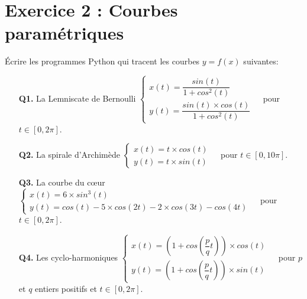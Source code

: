 \documentclass[a4paper,11pt]{article}
\theoremstyle{mytheor}
\begin{document}
\section*{Exercice 2 : Courbes paramétriques}
Écrire les programmes Python qui tracent les courbes $y = f(x)$ suivantes:
\begin{enumerate}
\item[\textbf{Q1.}] La Lemniscate de Bernoulli $
\left\{
\begin{array}{ll}
x(t) = \dfrac{sin(t)}{1 + cos^2(t)}&\\
y(t) =\dfrac{sin(t) \times cos(t)}{1 + cos^2(t)}&
\end{array} 
\right.$ 
pour $ t\in[0, 2\pi]$.
\item[\textbf{Q2.}] La spirale d'Archimède $
\left\{
\begin{array}{ll}
x(t) = t \times cos(t)&\\
y(t) =t \times sin(t)&
\end{array} 
\right.$ 
pour $ t\in[0, 10\pi]$.
\newpage
\item[\textbf{Q3.}] La courbe du c\oe{}ur $
\left\{
\begin{array}{ll}
x(t) = 6 \times sin^3(t)&\\
y(t) = cos(t)-5 \times cos(2t)-2 \times cos(3t)-cos(4t)&
\end{array} 
\right.$ 
pour $ t\in[0, 2\pi]$.
\item[\textbf{Q4.}] Les cyclo-harmoniques $
\left\{
\begin{array}{ll}
x(t) = \left( 1 + cos(\dfrac{p}{q}t)\right) \times cos(t) &\\
y(t) = \left( 1 + cos(\dfrac{p}{q}t)\right) \times sin(t)&
\end{array} 
\right.$ 
pour $p$ et $q$ entiers positifs et $ t\in[0, 2\pi]$.
\end{enumerate}
\end{document}

